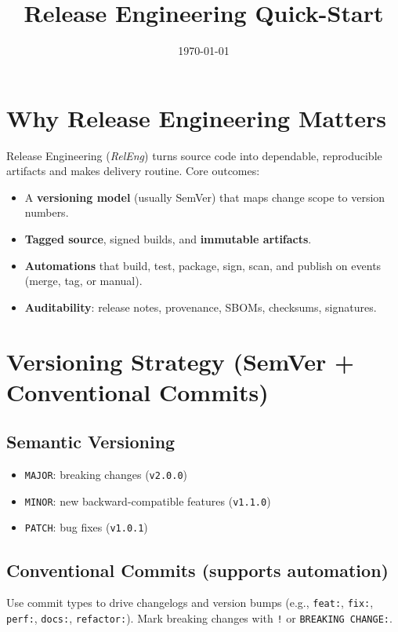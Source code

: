 \documentclass[11pt]{article}
\title{\bfseries Release Engineering Quick-Start}
\author{}
\date{\today}
\begin{document}
\maketitle
\tableofcontents
\clearpage

\section{Why Release Engineering Matters}
Release Engineering (\emph{RelEng}) turns source code into dependable, reproducible artifacts and makes delivery routine.
Core outcomes:
\begin{itemize}
  \item A \textbf{versioning model} (usually SemVer) that maps change scope to version numbers.
  \item \textbf{Tagged source}, signed builds, and \textbf{immutable artifacts}.
  \item \textbf{Automations} that build, test, package, sign, scan, and publish on events (merge, tag, or manual).
  \item \textbf{Auditability}: release notes, provenance, SBOMs, checksums, signatures.
\end{itemize}

\section{Versioning Strategy (SemVer + Conventional Commits)}
\subsection{Semantic Versioning}
\begin{itemize}
  \item \texttt{MAJOR}: breaking changes (\texttt{v2.0.0})
  \item \texttt{MINOR}: new backward-compatible features (\texttt{v1.1.0})
  \item \texttt{PATCH}: bug fixes (\texttt{v1.0.1})
\end{itemize}

\subsection{Conventional Commits (supports automation)}
Use commit types to drive changelogs and version bumps (e.g., \texttt{feat:}, \texttt{fix:}, \texttt{perf:}, \texttt{docs:}, \texttt{refactor:}).
Mark breaking changes with \texttt{!} or \texttt{BREAKING CHANGE:}.
\end{document}

